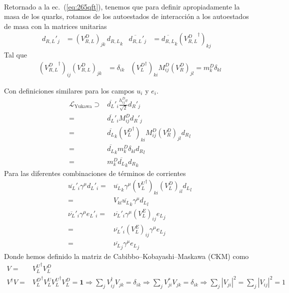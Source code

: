 \begin{frame}
\begin{align}
\end{align}
Retornado a la ec.~(\ref{eq:265qft}), tenemos que para definir apropiadamente la masa de los quarks, rotamos de los autoestados de interacción a los autoestados de masa con la matrices unitarias
\begin{align}
  \label{eq:229qft}
  {d_{R,L}}'_j&=(V^D_{R,L})_{jk}\, {d_{R,L}}_k&   \overline{d_{R,L}}'_j&=\overline{d_{R,L}}_k({V^D_{R,L}}^\dagger)_{kj}\,&
\end{align}
Tal que
\begin{align}
  ({V^D_{R,L}}^\dagger)_{ij}(V^D_{R,L})_{jk}&=\delta_{ik}& ({V^D_L}^\dagger)_{ki}M^D_{ij}(V^D_R)_{jl}=m^D_k\delta_{kl}
\end{align}

Con definiciones similares para los campos $u_i$ y $e_i$.
\begin{align}
\mathcal{L}_{\text{Yukawa}}\supset&\overline{d_L}'_i\frac{h_{ij}^Dv}{\sqrt{2}} {d_R}'_j\nonumber\\
=&\overline{d_L}'_iM^D_{ij} {d_R}'_j\nonumber\\
=&\overline{d_L}_k({V^D_L}^\dagger)_{ki}M^D_{ij}(V^D_R)_{jl} {d_R}_l\nonumber\\
=&\overline{d_L}_km^D_k\delta_{kl} {d_R}_l\nonumber\\
=&m^D_k\overline{d_L}_k{d_R}_k
\end{align}
Para las diferentes combinaciones de términos de corrientes
\begin{align}
  \overline{u_L}'_i \gamma^\mu{d_L}'_i=&\overline{u_L}_k\gamma^\mu({V^U_L}^\dagger)_{ki}(V^D_L)_{il} {d_L}_l\nonumber\\
  =&V_{kl}\overline{u_L}_k\gamma^\mu{d_L}_l\nonumber\\
  \overline{\nu_L}'_i\gamma^\mu {e_L}'_i=&\overline{\nu_L}'_i\gamma^\mu(V^E_L)_{ij} {e_L}_j\nonumber\\
  =&\overline{\nu_L}'_i(V^E_L)_{ij}\gamma^\mu {e_L}_j\nonumber\\
  =&\overline{\nu_L}_j\gamma^\mu{e_L}_j
\end{align}
Donde hemos definido la matriz de Cabibbo--Kobayashi--Maskawa (CKM) como
\begin{align}
  \label{eq:230qft}
  V=&{V^U_L}^\dagger V^D_L\nonumber\\
  V^\dagger V=&{V^D_L}^\dagger{V^U_L}{V^U_L}^\dagger V^D_L=\mathbf{1}\Rightarrow \sum_jV^\dagger_{ij}V_{jk}=\delta_{ik}\Rightarrow\sum_jV^*_{ji}V_{jk}=\delta_{ik}\Rightarrow\sum_j|V_{ji}|^2=\sum_j|V_{ij}|^2=1
\end{align}


\end{frame}
